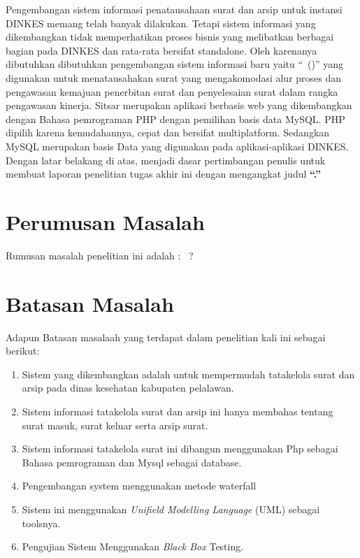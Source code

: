 Pengembangan sistem informasi penatausahaan surat dan arsip untuk instansi DINKES memang telah banyak dilakukan. Tetapi sistem informasi yang dikembangkan tidak memperhatikan proses bisnis yang melibatkan berbagai bagian pada DINKES dan rata-rata bersifat standalone. Oleh karenanya dibutuhkan dibutuhkan pengembangan sistem informasi baru yaitu “\namasistem \ (\singkatansistem)” yang digunakan untuk menatausahakan surat yang mengakomodasi alur proses dan pengawasan kemajuan penerbitan surat dan penyelesaian surat dalam rangka pengawasan kinerja. Sitsar merupakan aplikasi berbasis web yang dikembangkan dengan Bahasa pemrograman PHP dengan pemilihan basis data MySQL. PHP dipilih karena kemudahannya, cepat dan bersifat multiplatform. Sedangkan MySQL merupakan basis Data yang digunakan pada aplikasi-aplikasi DINKES.
Dengan latar belakang di atas, menjadi dasar pertimbangan penulis untuk membuat laporan penelitian tugas akhir ini dengan mengangkat judul \textbf{“\judulkecil.”} 



\section{Perumusan Masalah}
Rumusan masalah penelitian ini adalah : \rumusanmasalah \ ?


\section{Batasan Masalah}
Adapun Batasan masalaah yang terdapat dalam penelitian kali ini sebagai berikut:
\begin{enumerate}
	\item Sistem yang dikembangkan adalah untuk mempermudah tatakelola surat dan arsip pada dinas kesehatan kabupaten pelalawan.
	\item Sistem informasi tatakelola surat dan arsip ini hanya membahas tentang surat masuk, surat keluar serta arsip surat.
	\item Sistem informasi tatakelola surat ini dibangun menggunakan Php sebagai Bahasa pemrograman dan Mysql sebagai database.
	\item Pengembangan system menggunakan metode waterfall
	\item Sistem ini menggunakan \textit{Unifield Modelling Language} (UML) sebagai
	toolsnya.
	\item Pengujian Sistem Menggunakan \textit{Black Box} Testing.
\end{enumerate}

